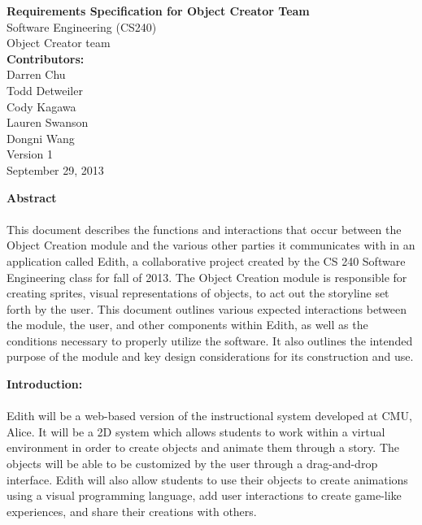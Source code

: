 \documentclass[12pt]{report}
\begin{document}
\begin{center}
{\bf\huge Requirements Specification for Object Creator Team}
\\[3\baselineskip]
{\large Software Engineering (CS240)}
\\[2\baselineskip]
{\large Object Creator team}
\\[2\baselineskip]
{\bf Contributors: }\\
Darren Chu \\ Todd Detweiler \\ Cody Kagawa \\  Lauren Swanson \\  Dongni Wang 
\\[8\baselineskip]
Version 1\\
September 29, 2013 
\end{center} 
\pagebreak

\begin{center}
{\bf\large Abstract \\[1\baselineskip] }
\end{center}
{
\paragraph{\parindent 20pt}This document describes the functions and interactions that occur between the Object Creation module and the various other parties it communicates with in an application called Edith, a collaborative project created by the CS 240 Software Engineering class for fall of 2013. The Object Creation module is responsible for creating sprites, visual representations of objects, to act out the storyline set forth by the user. This document outlines various expected interactions between the module, the user, and other components within Edith, as well as the conditions necessary to properly utilize the software. It also outlines the intended purpose of the module and key design considerations for its construction and use.
}
\pagebreak

{\bf\large Introduction: \\[0\baselineskip] }
\paragraph{\parindent 20pt} Edith will be a web-based version of the instructional system developed at CMU, Alice. It will be a 2D system which allows students to work within a virtual environment in order to create objects and animate them through a story. The objects will be able to be customized by the user through a drag-and-drop interface. Edith will also allow students to use their objects to create animations using a visual programming language, add user interactions to create game-like experiences, and share their creations with others.
\end{document}
